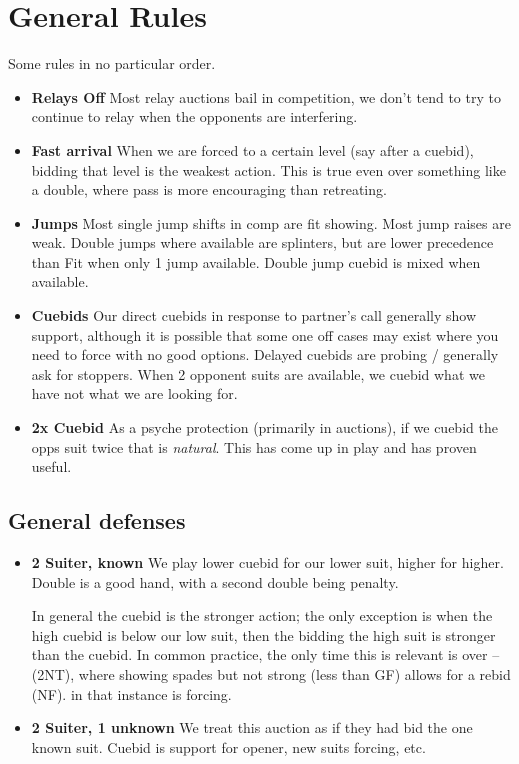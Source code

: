 \documentclass[tom-ari]{subfile}
\begin{document}
	
\chapter{General Rules}

Some rules in no particular order.

\begin{itemize}[]
\item \textbf{Relays Off} Most relay auctions bail in competition, we don't tend to try to continue to relay when the opponents are interfering.
\item \textbf{Fast arrival} When we are forced to a certain level (say after a cuebid), bidding that level is the weakest action. This is true even over something like a double, where pass is more encouraging than retreating.
\item \textbf{Jumps} Most single jump shifts in comp are fit showing. Most jump raises are weak. Double jumps where available are splinters, but are lower precedence than Fit when only 1 jump available. Double jump cuebid is mixed when available.
\item \textbf{Cuebids} Our direct cuebids in response to partner's call generally show support, although it is possible that some one off cases may exist where you need to force with no good options.  Delayed cuebids are probing / generally ask for stoppers. When 2 opponent suits are available, we cuebid what we have not what we are looking for.
\item \textbf{2x Cuebid} As a psyche protection (primarily in  auctions), if we cuebid the opps suit twice that is \textit{natural}. This has come up in play and has proven useful.
\end{itemize}

\section{General defenses}

\begin{itemize}[]
\item \textbf{2 Suiter, known} We play lower cuebid for our lower suit, higher for higher. Double is a good hand, with a second double being penalty.

In general the cuebid is the stronger action; the only exception is when the high cuebid is below our low suit, then the bidding the high suit is stronger than the cuebid.  In common practice, the only time this is relevant is over --(2NT), where  showing spades but not strong (less than GF) allows for a  rebid (NF).  in that instance is forcing.	

\item \textbf{2 Suiter, 1 unknown} We treat this auction as if they had bid the one known suit. Cuebid is support for opener, new suits forcing, etc.
\end{itemize}
\end{document}
